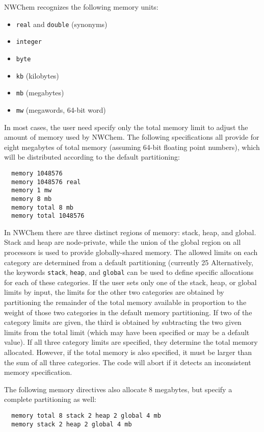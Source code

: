 NWChem recognizes the following memory units:
\begin{itemize}
\item \verb+real+ and \verb+double+ (synonyms)
\item \verb+integer+
\item \verb+byte+
\item \verb+kb+ (kilobytes)
\item \verb+mb+ (megabytes)
\item \verb+mw+ (megawords, 64-bit word)
\end{itemize}

In most cases, the user need specify only the total memory limit to 
adjust the amount of memory used by NWChem. The following specifications 
all provide for eight megabytes of total
memory (assuming 64-bit floating point numbers), which will be
distributed according to the default partitioning:
\begin{verbatim}
  memory 1048576
  memory 1048576 real
  memory 1 mw
  memory 8 mb
  memory total 8 mb
  memory total 1048576
\end{verbatim}

In NWChem there are three distinct regions of memory: stack, heap, 
and global. Stack and heap are node-private, while the union of the 
global region on all processors is used to provide globally-shared memory.  
The allowed limits on each category are determined from a default 
partitioning (currently 25%
Alternatively, the keywords \verb+stack+, \verb+heap+, and
\verb+global+ can be used to define specific allocations for each of
these categories.  If the user sets only one of the stack, heap, or
global limits by input, the limits for the other two categories are
obtained by partitioning the remainder of the total memory available
in proportion to the weight of those two categories in the default
memory partitioning.  If two of the category limits are given, the
third is obtained by subtracting the two given limits from the total
limit (which may have been specified or may be a default value).  If
all three category limits are specified, they determine the total
memory allocated.  However, if the total memory is also specified, it
must be larger than the sum of all three categories.  The code will
abort if it detects an inconsistent memory specification.

The following memory directives also allocate 8 megabytes, but specify
a complete partitioning as well:

\begin{verbatim}
  memory total 8 stack 2 heap 2 global 4 mb
  memory stack 2 heap 2 global 4 mb
\end{verbatim}

